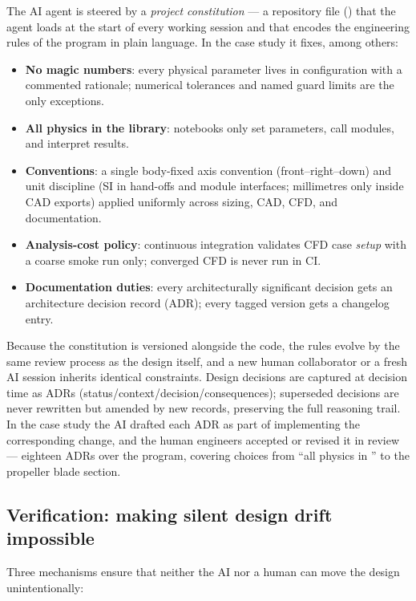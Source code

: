 The AI agent is steered by a \emph{project constitution} --- a
repository file () that the agent loads at the start
of every working session and that encodes the engineering rules of the
program in plain language. In the case study it fixes, among others:

\begin{itemize}[nosep]
\item \textbf{No magic numbers}: every physical parameter lives in
  configuration with a commented rationale; numerical tolerances and
  named guard limits are the only exceptions.
\item \textbf{All physics in the library}: notebooks only set
  parameters, call modules, and interpret results.
\item \textbf{Conventions}: a single body-fixed axis convention
  (front--right--down) and unit discipline (SI in hand-offs and module
  interfaces; millimetres only inside CAD exports) applied uniformly
  across sizing, CAD, CFD, and documentation.
\item \textbf{Analysis-cost policy}: continuous integration validates
  CFD case \emph{setup} with a coarse smoke run only; converged CFD is
  never run in CI.
\item \textbf{Documentation duties}: every architecturally significant
  decision gets an architecture decision record (ADR); every tagged
  version gets a changelog entry.
\end{itemize}

Because the constitution is versioned alongside the code, the rules
evolve by the same review process as the design itself, and a new
human collaborator or a fresh AI session inherits identical
constraints. Design decisions are captured at decision time as ADRs
(status/context/decision/consequences); superseded decisions are never
rewritten but amended by new records, preserving the full reasoning
trail. In the case study the AI drafted each ADR as part of
implementing the corresponding change, and the human engineers
accepted or revised it in review --- eighteen ADRs over the program,
covering choices from ``all physics in '' to the propeller
blade section.

\subsection{Verification: making silent design drift impossible}
\label{sec:verification}

Three mechanisms ensure that neither the AI nor a human can move the
design unintentionally:

